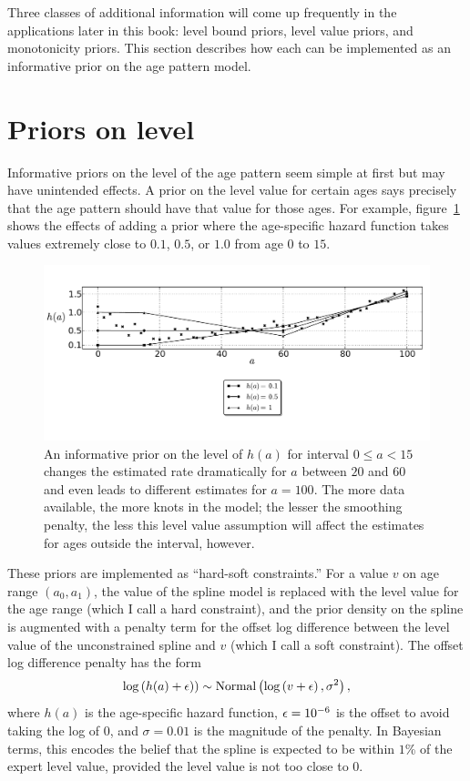 Three classes of additional information will come up
frequently in the applications later in this book: level bound priors,
level value priors, and monotonicity priors. This section describes
how each can be implemented as an informative prior on the age pattern
model.


\section{Priors on level}

Informative priors on the level of the age pattern seem simple at
first but may have unintended effects.  A prior on the level value for
certain ages says precisely that the age pattern should have that
value for those ages.  For example, figure~\ref{level-value-priors}
shows the effects of adding a prior where the age-specific hazard function takes values extremely
close to $0.1$, $0.5$, or $1.0$ from age $0$ to $15$.


\begin{figure}[h]
\begin{center}
\includegraphics[width=\textwidth]{level_value-smoothing-splines.pdf}
\caption{An informative prior on the level of $h(a)$ for interval $0 \leq a <
  15$ changes the estimated rate dramatically for $a$ between $20$ and
  $60$ and even leads to different estimates for $a = 100$.  The more
  data available, the more knots in the model; the lesser the
  smoothing penalty, the less this level value assumption will affect
  the estimates for ages outside the interval, however.  }
\label{level-value-priors}
\end{center}
\end{figure}



These priors are implemented as ``hard-soft constraints.''  For a
value $v$ on age range $(a_0,a_1)$, the value of the spline model is
replaced with the level value for the age range (which I call a hard
constraint), and the prior density on the spline is augmented with a
penalty term for the offset log difference between the level value of
the unconstrained spline and $v$ (which I call a soft constraint). The
offset log difference penalty has the form
\[
\log\left(h(a)+\epsilon)\right) \sim
 \operatorname{Normal}\left(\log\left(v + \epsilon\right), \sigma^2\right),
\]
where $h(a)$ is the age-specific hazard function, $\epsilon = 10^{-6}$ is the
offset to avoid taking the log of $0$, and $\sigma = 0.01$ is the
magnitude of the penalty.  In Bayesian terms, this encodes the belief
that the spline is expected to be within $1$\% of the expert level
value, provided the level value is not too close to $0$.

